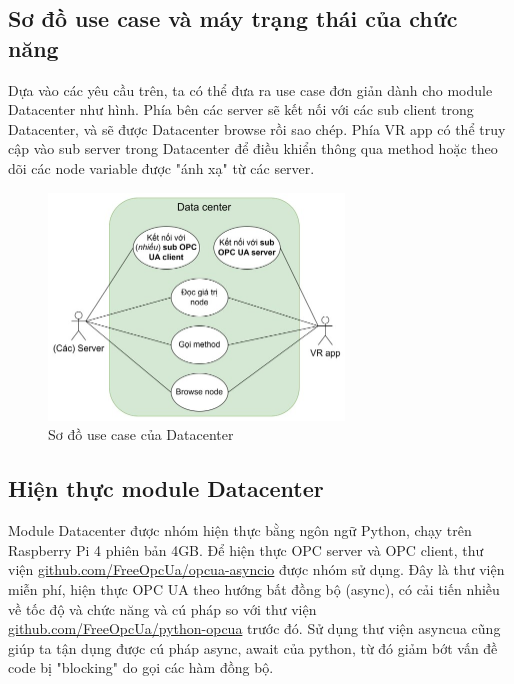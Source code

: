 \subsection{Sơ đồ use case và máy trạng thái của chức năng}


Dựa vào các yêu cầu trên, ta có thể đưa ra use case đơn giản dành cho module Datacenter như hình. Phía bên các server sẽ kết nối với các sub client trong Datacenter, và sẽ được Datacenter browse rồi sao chép. Phía VR app có thể truy cập vào sub server trong Datacenter để điều khiển thông qua method hoặc theo dõi các node variable được "ánh xạ" từ các server.

\begin{figure}[H]
    \centering
    \includegraphics[width=0.7\textwidth]{Images/Implementation/Datacenter/Datacenter_usecase.jpg}
    \caption{Sơ đồ use case của Datacenter}
    \label{fig:use_case_Datacenter}
\end{figure}


\subsection{Hiện thực module Datacenter}

Module Datacenter được nhóm hiện thực bằng ngôn ngữ Python, chạy trên Raspberry Pi 4 phiên bản 4GB. Để hiện thực OPC server và OPC client, thư viện \href{https://github.com/FreeOpcUa/opcua-asyncio}{github.com/FreeOpcUa/opcua-asyncio} được nhóm sử dụng. Đây là thư viện miễn phí, hiện thực OPC UA theo hướng bất đồng bộ (async), có cải tiến nhiều về tốc độ và chức năng và cú pháp so với thư viện \href{https://github.com/FreeOpcUa/python-opcua}{github.com/FreeOpcUa/python-opcua} trước đó. Sử dụng thư viện asyncua cũng giúp ta tận dụng được cú pháp async, await của python, từ đó giảm bớt vấn đề code bị "blocking" do gọi các hàm đồng bộ.

